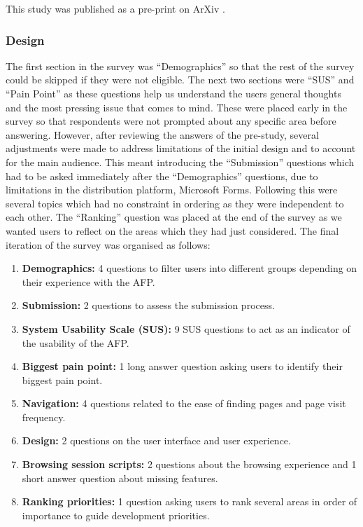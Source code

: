\documentclass[bsc,frontabs,oneside,singlespacing,parskip,deptreport,logo]{infthesis}
\begin{document}
This study was published as a pre-print on ArXiv \cite{mackenzie2021evaluation}.

\subsubsection{Design}
\cbstart
The first section in the survey was ``Demographics'' so that the rest of the survey could be skipped if they were not eligible. The next two sections were ``SUS'' and ``Pain Point'' as these questions help us understand the users general thoughts and the most pressing issue that comes to mind. These were placed early in the survey so that respondents were not prompted about any specific area before answering. However, after reviewing the answers of the pre-study, several adjustments were made to address limitations of the initial design and to account for the main audience. This meant introducing the ``Submission'' questions which had to be asked immediately after the ``Demographics'' questions, due to limitations in the distribution platform, Microsoft Forms. Following this were several topics which had no constraint in ordering as they were independent to each other. The ``Ranking'' question was placed at the end of the survey as we wanted users to reflect on the areas which they had just considered. The final iteration of the survey was organised as follows:
\cbend

\begin{enumerate}
  \item \textbf{Demographics:} 4 questions to filter users into different groups depending on their experience with the AFP\@.
  \item \textbf{Submission:} 2 questions to assess the submission process.
  \item \textbf{System Usability Scale (SUS):} 9 SUS \cite{brooke1996sus} questions to act as an indicator of the usability of the AFP\@.
  \item \textbf{Biggest pain point:} 1 long answer question asking users to identify their biggest pain point.
  \item \textbf{Navigation:} 4 questions related to the ease of finding pages and page visit frequency.
  \item \textbf{Design:} 2 questions on the user interface and user experience.
  \item \textbf{Browsing session scripts:} 2 questions about the browsing experience and 1 short answer question about missing features.
  \item \textbf{Ranking priorities:} 1 question asking users to rank several areas in order of importance \cbstart to guide development priorities. \cbend
\end{enumerate}
\end{document}
